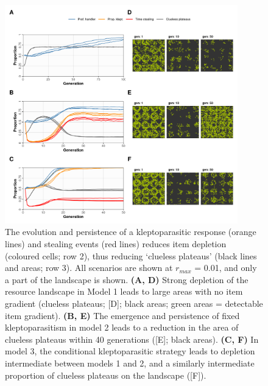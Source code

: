 \documentclass[11pt]{article}
\begin{document}
\begin{figure}[h!]
    \centering
    \includegraphics[width=0.90\textwidth]{figures/fig_08.png}
    \caption{
        The evolution and persistence of a kleptoparasitic response (orange lines) and stealing events (red lines) reduces item depletion (coloured cells; row 2), thus reducing `clueless plateaus' (black lines and areas; row 3). All scenarios are shown at $r_{max}$ = 0.01, and only a part of the landscape is shown.
        \textbf{(A, D)} Strong depletion of the resource landscape in Model 1 leads to large areas with no item gradient (clueless plateaus; [D]; black areas; green areas = detectable item gradient).
        \textbf{(B, E)} The emergence and persistence of fixed kleptoparasitism in model 2 leads to a reduction in the area of clueless plateaus within 40 generations ([E]; black areas).
        \textbf{(C, F)} In model 3, the conditional kleptoparasitic strategy leads to depletion intermediate between models 1 and 2, and a similarly intermediate proportion of clueless plateaus on the landscape ([F]).
    }
    \label{Fig:CluelessLandscape}
\end{figure}





\end{document}
